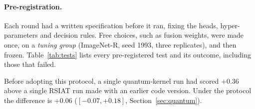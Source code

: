 \paragraph{Pre-registration.}
Each round had a written specification before it ran, fixing the heads,
hyper-parameters and decision rules. Free choices, such as fusion weights,
were made once, on a \emph{tuning group} (ImageNet-R, seed 1993, three
replicates), and then frozen. Table~\ref{tab:tests} lists every
pre-registered test and its outcome, including those that failed.

Before adopting this protocol, a single quantum-kernel run had scored $+0.36$
above a single RSIAT run made with an earlier code version. Under the
protocol the difference is $+0.06$ ($[-0.07,+0.18]$, Section~\ref{sec:quantum}).
